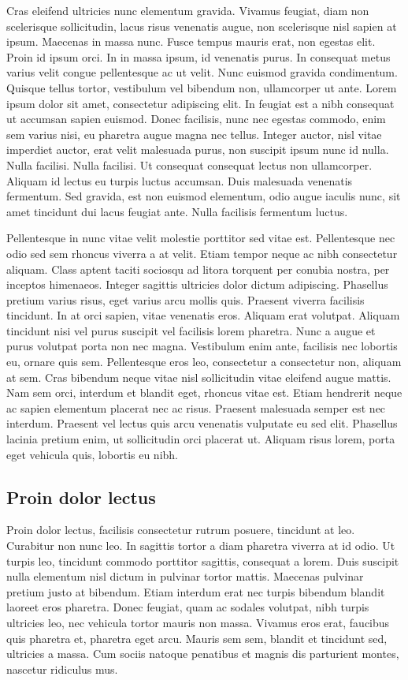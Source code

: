 Cras eleifend ultricies nunc elementum gravida.
Vivamus feugiat, diam non scelerisque sollicitudin, lacus risus venenatis augue, non scelerisque nisl sapien at ipsum.
Maecenas in massa nunc.
Fusce tempus mauris erat, non egestas elit.
Proin id ipsum orci.
In in massa ipsum, id venenatis purus.
In consequat metus varius velit congue pellentesque ac ut velit.
Nunc euismod gravida condimentum.
Quisque tellus tortor, vestibulum vel bibendum non, ullamcorper ut ante.
Lorem ipsum dolor sit amet, consectetur adipiscing elit.
In feugiat est a nibh consequat ut accumsan sapien euismod.
Donec facilisis, nunc nec egestas commodo, enim sem varius nisi, eu pharetra augue magna nec tellus.
Integer auctor, nisl vitae imperdiet auctor, erat velit malesuada purus, non suscipit ipsum nunc id nulla.
Nulla facilisi.
Nulla facilisi.
Ut consequat consequat lectus non ullamcorper.
Aliquam id lectus eu turpis luctus accumsan.
Duis malesuada venenatis fermentum.
Sed gravida, est non euismod elementum, odio augue iaculis nunc, sit amet tincidunt dui lacus feugiat ante.
Nulla facilisis fermentum luctus.

Pellentesque in nunc vitae velit molestie porttitor sed vitae est.
Pellentesque nec odio sed sem rhoncus viverra a at velit.
Etiam tempor neque ac nibh consectetur aliquam.
Class aptent taciti sociosqu ad litora torquent per conubia nostra, per inceptos himenaeos.
Integer sagittis ultricies dolor dictum adipiscing.
Phasellus pretium varius risus, eget varius arcu mollis quis.
Praesent viverra facilisis tincidunt.
In at orci sapien, vitae venenatis eros.
Aliquam erat volutpat.
Aliquam tincidunt nisi vel purus suscipit vel facilisis lorem pharetra.
Nunc a augue et purus volutpat porta non nec magna.
Vestibulum enim ante, facilisis nec lobortis eu, ornare quis sem.
Pellentesque eros leo, consectetur a consectetur non, aliquam at sem.
Cras bibendum neque vitae nisl sollicitudin vitae eleifend augue mattis.
Nam sem orci, interdum et blandit eget, rhoncus vitae est.
Etiam hendrerit neque ac sapien elementum placerat nec ac risus.
Praesent malesuada semper est nec interdum.
Praesent vel lectus quis arcu venenatis vulputate eu sed elit.
Phasellus lacinia pretium enim, ut sollicitudin orci placerat ut.
Aliquam risus lorem, porta eget vehicula quis, lobortis eu nibh.

\subsection{Proin dolor lectus}
Proin dolor lectus, facilisis consectetur rutrum posuere, tincidunt at leo.
Curabitur non nunc leo.
In sagittis tortor a diam pharetra viverra at id odio.
Ut turpis leo, tincidunt commodo porttitor sagittis, consequat a lorem.
Duis suscipit nulla elementum nisl dictum in pulvinar tortor mattis.
Maecenas pulvinar pretium justo at bibendum.
Etiam interdum erat nec turpis bibendum blandit laoreet eros pharetra.
Donec feugiat, quam ac sodales volutpat, nibh turpis ultricies leo, nec vehicula tortor mauris non massa.
Vivamus eros erat, faucibus quis pharetra et, pharetra eget arcu.
Mauris sem sem, blandit et tincidunt sed, ultricies a massa.
Cum sociis natoque penatibus et magnis dis parturient montes, nascetur ridiculus mus.

